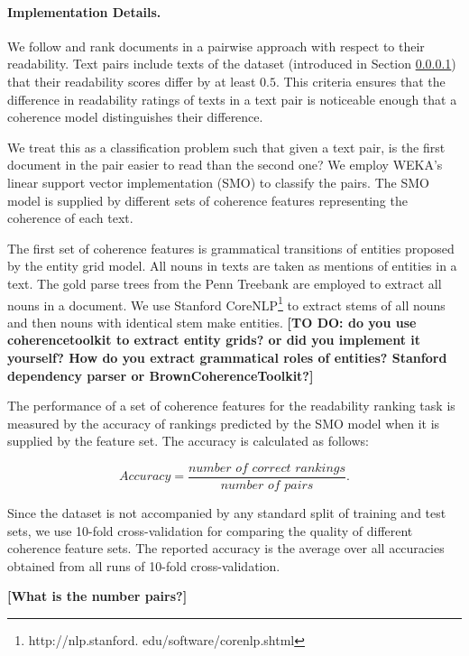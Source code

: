 \paragraph{Implementation Details. }
%
We follow  and rank documents in a pairwise approach with respect to their readability. 
Text pairs include texts of the dataset (introduced in Section \ref{}) that their readability scores differ by at least $0.5$. 
This criteria ensures that the difference in readability ratings of texts in a text pair is noticeable enough that a coherence model distinguishes their difference. 

We treat this as a classification problem such that given a text pair, is the first document in the pair easier to read than the second one? 
We employ WEKA's linear support vector implementation (SMO)  to classify the pairs.
The SMO model is supplied by different sets of coherence features representing the coherence of each text. 

The first set of coherence features is grammatical transitions of entities proposed by the entity grid model. 
All nouns in texts are taken as mentions of entities in a text. 
The gold parse trees from the Penn Treebank \cite{marcus94} are employed to extract all nouns in a document. 
We use Stanford CoreNLP\footnote{http://nlp.stanford. edu/software/corenlp.shtml} to extract stems of all nouns and then nouns with identical stem make entities. 
\textbf{[TO DO: do you use coherencetoolkit to extract entity grids? or did you implement it yourself? How do you extract grammatical roles of entities? Stanford dependency parser or BrownCoherenceToolkit?]}

The performance of a set of coherence features for the readability ranking task is measured by the accuracy of rankings  predicted by the SMO model when it is supplied by the feature set. 
The accuracy is calculated as follows:

\begin{equation}
Accuracy = \frac{\textit{number of correct rankings}}{\textit{number of pairs}}. 
\end{equation}

Since the dataset is not accompanied by any standard split of training and test sets, we use 10-fold cross-validation for comparing the quality of different coherence feature sets. 
The reported accuracy is the average over all accuracies obtained from all runs of 10-fold cross-validation. 

\textbf{[What is the number pairs?]}

